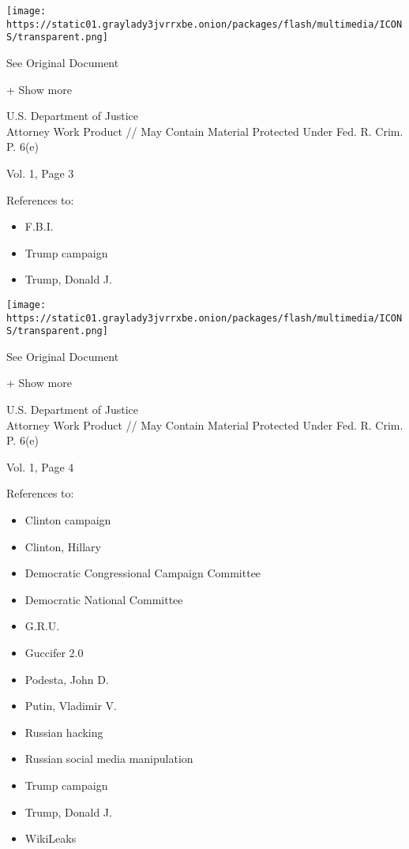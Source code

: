 \protect\hyperlink{}{}

\texttt{[image: https://static01.graylady3jvrrxbe.onion/packages/flash/multimedia/ICONS/transparent.png]}

See Original Document

+ Show more

U.S. Department of Justice\\
Attorney Work Product // May Contain Material Protected Under Fed. R.
Crim. P. 6(e)

Vol. 1, Page 3

References to:

\begin{itemize}
\tightlist
\item
  F.B.I.
\item
  Trump campaign
\item
  Trump, Donald J.
\end{itemize}

\protect\hyperlink{}{}

\texttt{[image: https://static01.graylady3jvrrxbe.onion/packages/flash/multimedia/ICONS/transparent.png]}

See Original Document

+ Show more

U.S. Department of Justice\\
Attorney Work Product // May Contain Material Protected Under Fed. R.
Crim. P. 6(e)

Vol. 1, Page 4

References to:

\begin{itemize}
\tightlist
\item
  Clinton campaign
\item
  Clinton, Hillary
\item
  Democratic Congressional Campaign Committee
\item
  Democratic National Committee
\item
  G.R.U.
\item
  Guccifer 2.0
\item
  Podesta, John D.
\item
  Putin, Vladimir V.
\item
  Russian hacking
\item
  Russian social media manipulation
\item
  Trump campaign
\item
  Trump, Donald J.
\item
  WikiLeaks
\end{itemize}


